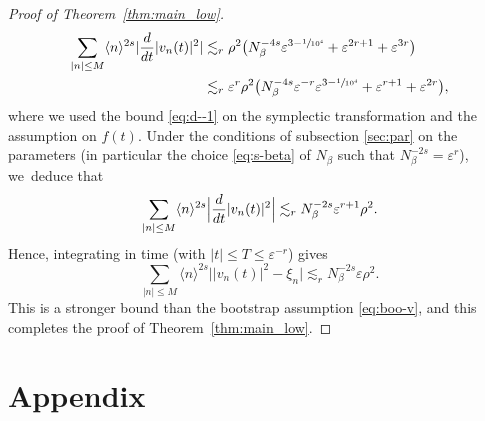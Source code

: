 \documentclass[JEP,XML,SOM,Unicode,published]{cedram}
\theoremstyle{plain}
\theoremstyle{definition}
\newcommand{\1}{\mathbf{1}}
\let\epsilon\varepsilon
\begin{document}
\begin{proof}[Proof of Theorem~\ref{thm:main_low}]
\begin{align*}
\sum_{|n|\leq M}\langle n\rangle^{2s}|\frac{d}{dt}|v_{n}(t)|^{2}|
&\lesssim_{r}
\rho^{2}
\big(
N_{\beta}^{-4s}\epsilon^{3-\sfrac{1}{10^{4}}}
+
\epsilon^{2r+1}
+\epsilon^{3r}
\big) \\
&\lesssim_{r}
\epsilon^{r}\rho^{2}
\big(
N_{\beta}^{-4s}\epsilon^{-r}\epsilon^{3-\sfrac{1}{10^{4}}}+\epsilon^{r+1} + \epsilon^{2r}
\big),
\end{align*}
where we used the bound \eqref{eq:d--1} on the symplectic transformation and the assumption on $f(t)$. Under the conditions of subsection \eqref{sec:par} on the parameters (in particular the choice \eqref{eq:s-beta} of $N_{\beta}$ such that $N_{\beta}^{-2s}=\epsilon^{r}$), we~deduce that
\[
\sum_{|n|\leq M}\langle n\rangle^{2s}\Bigl|\frac{d}{dt}|v_{n}(t)|^{2}\Bigr|
\lesssim_{r} N_{\beta}^{-2s}\epsilon^{r+1}\rho^{2}.
\]
Hence, integrating in time (with $|t|\leq T\leq \epsilon^{-r}$) gives
\[
\sum_{|n|\leq M}\langle n\rangle^{2s}\bigl||v_{n}(t)|^{2}-\xi_{n}\bigr|
\lesssim_{r} N_{\beta}^{-2s}\epsilon\rho^{2}.
\]
This is a stronger bound than the bootstrap assumption \eqref{eq:boo-v}, and this completes the proof of Theorem~\ref{thm:main_low}.
\end{proof}

\appendix{}
\section*{Appendix}

\label{app-lp}
\end{document}
